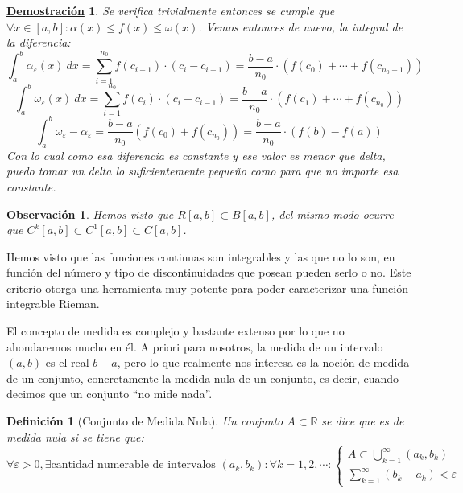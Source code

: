 \documentclass[10pt,a4paper,openright]{book}
\theoremstyle{break}
\newtheorem{defi}{Definición}[chapter]
\newtheorem*{demo}{\underline{Demostración}}
\newtheorem{obs}{\underline{Observación}}[chapter]
\newcommand{\dif}[1]{\ d#1}
\begin{document}
\begin{demo}
Se verifica trivialmente entonces se cumple que $\forall x\in [a,b]: \alpha(x)\leq f(x)\leq \omega(x)$. Vemos entonces de nuevo, la integral de la diferencia:
$$\int_{a}^{b}\alpha_\varepsilon(x) \dif{x} = \sum_{i = 1}^{n_0} f(c_{i-1})\cdot (c_i-c_{i-1}) = \frac{b-a}{n_0} \cdot (f(c_0)+\cdots + f(c_{n_0-1}))$$
$$\int_{a}^{b}\omega_\varepsilon(x) \dif{x} = \sum_{i = 1}^{n_0} f(c_i)\cdot (c_i-c_{i-1}) = \frac{b-a}{n_0} \cdot (f(c_1)+\cdots + f(c_{n_0}))$$
$$\int_{a}^{b} \omega_\varepsilon - \alpha_\varepsilon = \frac{b-a}{n_0}(f(c_0)+f(c_{n_0})) = \frac{b-a}{n_0}\cdot (f(b)-f(a))$$
Con lo cual como esa diferencia es constante y ese valor es menor que delta, puedo tomar un delta lo suficientemente pequeño como para que no importe esa constante.
\end{demo}

\begin{obs}
Hemos visto que $R[a,b]\subset B[a,b]$, del mismo modo ocurre que $C^k[a,b]\subset C^{1}[a,b]\subset C[a,b]$.
\end{obs}

Hemos visto que las funciones continuas son integrables y las que no lo son, en función del número y tipo de discontinuidades que posean pueden serlo o no. Este criterio otorga una herramienta muy potente para poder caracterizar una función integrable Rieman.

El concepto de medida es complejo y bastante extenso por lo que no ahondaremos mucho en él. A priori para nosotros, la medida de un intervalo $(a,b)$ es el real $b-a$, pero lo que realmente nos interesa es la noción de medida de un conjunto, concretamente la medida nula de un conjunto, es decir, cuando decimos que un conjunto ``no mide nada''. 

\begin{defi}[Conjunto de Medida Nula]
Un conjunto $A\subset \mathbb R$ se dice que es de medida nula si se tiene que:
$$\forall \varepsilon > 0, \exists \mbox{cantidad numerable de intervalos }(a_k,b_k):\forall k = 1,2,\cdots: \begin{cases} A \displaystyle \subset  \displaystyle\bigcup^\infty_{k=1}(a_k,b_k) \\ \displaystyle \sum_{k=1}^{\infty} (b_k - a_k) < \varepsilon\end{cases}$$
\end{defi}
\end{document}
